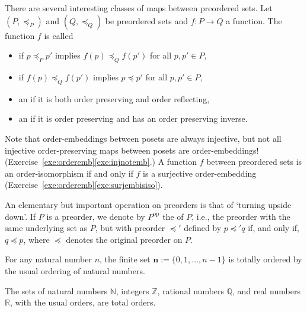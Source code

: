 There are several interesting classes of maps between preordered sets.
Let $(P,\preceq_P)$ and $(Q,\preceq_Q)$ be preordered sets and $f \colon P \to Q$ a function. The function $f$ is called
\begin{itemize}
\item {} if $p \preceq_P p'$ implies $f(p) \preceq_Q f(p')$ for all $p, p' \in P$,
\item {} if $f(p) \preceq_Q f(p')$ implies $p \preceq p'$ for all $p, p' \in P$,
\item an  if it is both order preserving and order reflecting,
\item an  if it is order preserving and has an order preserving inverse.
\end{itemize}
Note that order-embeddings between posets are always injective, but not all injective order-preserving maps between posets are order-embeddings! (Exercise~\ref{exe:orderemb}\ref{exe:injnotemb}.) A function $f$ between preordered sets is an order-isomorphism if and only if $f$ is a surjective order-embedding (Exercise~\ref{exe:orderemb}\ref{exe:surjembisiso}).

An elementary but important operation on preorders is that of `turning upside down'. If $P$ is a preorder, we denote by $P^\mathrm{op}$ the  of $P$, i.e., the preorder with the same underlying set as $P$, but with preorder $\preceq'$ defined by $p \preceq' q$ if, and only if, $q \preceq p$, where $\preceq$ denotes the original preorder on $P$.










\begin{example} \label{exa:finitetotal}
For any natural number $n$, the finite set $\mathbf{n} := \{0,1,\dots,n-1\}$ is totally ordered by the usual ordering of natural numbers. %
\end{example}

\begin{example} \label{exa:totalorders}
The sets of natural numbers $\mathbb{N}$, integers $\mathbb{Z}$, rational numbers $\mathbb{Q}$, and real numbers $\mathbb{R}$, with the usual orders, are total orders. %
\end{example}

